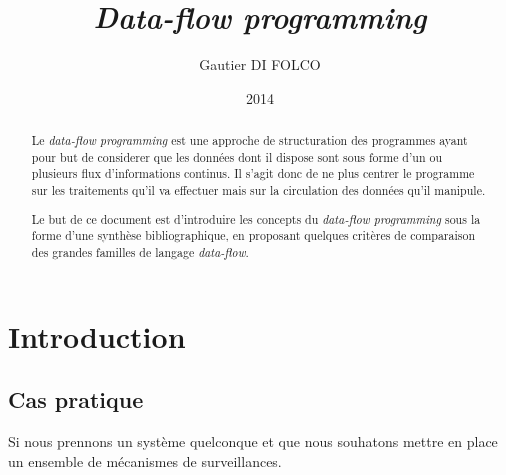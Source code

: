 \documentclass{article}
\title{\emph{Data-flow programming}}
\author{Gautier DI FOLCO}
\date{2014}
\begin{document}
\maketitle
\tableofcontents

\begin{abstract}
Le \emph{data-flow programming} est une approche de structuration des programmes
ayant pour but de considerer que les données dont il dispose sont sous forme
d'un ou plusieurs flux d'informations continus.
Il s'agit donc de ne plus centrer le programme sur les traitements qu'il va
effectuer mais sur la circulation des données qu'il manipule.

Le but de ce document est d'introduire les concepts du \emph{data-flow programming}
sous la forme d'une synthèse bibliographique, en proposant quelques critères de
comparaison des grandes familles de langage \emph{data-flow}.
\end{abstract}




% 

\section{Introduction}\label{introduction}

\subsection{Cas pratique}
Si nous prennons un système quelconque et que nous souhatons mettre en place un
ensemble de mécanismes de surveillances.
\end{document}
